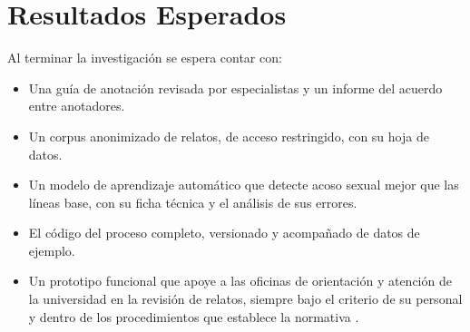 \section{Resultados Esperados}
Al terminar la investigación se espera contar con:
\begin{itemize}
	\item Una guía de anotación revisada por especialistas y un informe del acuerdo entre anotadores.
	\item Un corpus anonimizado de relatos, de acceso restringido, con su hoja de datos.
	\item Un modelo de aprendizaje automático que detecte acoso sexual mejor que las líneas base, con su ficha técnica y el análisis de sus errores.
	\item El código del proceso completo, versionado y acompañado de datos de ejemplo.
	\item Un prototipo funcional que apoye a las oficinas de orientación y atención de la universidad en la revisión de relatos, siempre bajo el criterio de su personal y dentro de los procedimientos que establece la normativa \citep{ds0142019}.
\end{itemize}
